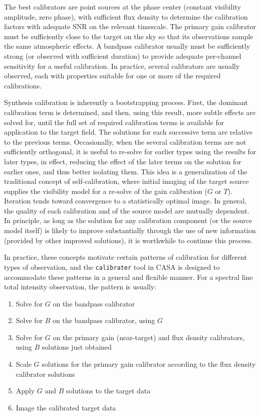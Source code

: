 The best calibrators are point sources at the phase center (constant
visibility amplitude, zero phase), with sufficient flux density to
determine the calibration factors with adequate SNR on the relevant
timescale. The primary gain calibrator must be sufficiently close to
the target on the sky so that its observations sample the same
atmospheric effects. A bandpass calibrator usually must be
sufficiently strong (or observed with sufficient duration) to provide
adequate per-channel sensitivity for a useful calibration. In
practice, several calibrators are usually observed, each with
properties suitable for one or more of the required calibrations. 

Synthesis calibration is inherently a bootstrapping process. First,
the dominant calibration term is determined, and then, using this
result, more subtle effects are solved for, until the full set of
required calibration terms is available for application to the target
field. The solutions for each successive term are relative to the
previous terms. Occasionally, when the several calibration terms are
not sufficiently orthogonal, it is useful to re-solve for earlier
types using the results for later types, in effect, reducing the
effect of the later terms on the solution for earlier ones, and thus
better isolating them. This idea is a generalization of the
traditional concept of self-calibration, where initial imaging of the
target source supplies the visibility model for a re-solve of the gain
calibration ($G$ or $T$). Iteration tends toward convergence to a
statistically optimal image. In general, the quality of each
calibration and of the source model are mutually dependent. In
principle, as long as the solution for any calibration component (or
the source model itself) is likely to improve substantially through
the use of new information (provided by other improved solutions), it
is worthwhile to continue this process. 

In practice, these concepts motivate certain patterns of calibration
for different types of observation, and the {\tt calibrater} tool in CASA is
designed to accommodate these patterns in a general and flexible
manner. For a spectral line total intensity observation, the pattern
is usually: 

\begin{enumerate}
   \item Solve for $G$ on the bandpass calibrator
   \item Solve for $B$ on the bandpass calibrator, using $G$
   \item Solve for $G$ on the primary gain (near-target) and flux
      density calibrators, using $B$ solutions just obtained 
   \item Scale $G$ solutions for the primary gain calibrator according to
      the flux density calibrator solutions 
   \item Apply $G$ and $B$ solutions to the target data
   \item Image the calibrated target data 
\end{enumerate}

